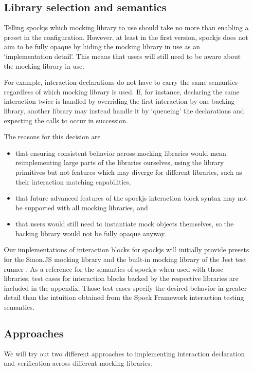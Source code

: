 \subsection{Library selection and semantics}
Telling spockjs which mocking library to use should
take no more than enabling a preset in the configuration.
However, at least in the first version,
spockjs does not aim to be fully opaque
by hiding the mocking library in use as an `implementation detail'.
This means that users will still need to be aware
about the mocking library in use.

For example, interaction declarations
do not have to carry the same semantics
regardless of which mocking library is used.
If, for instance, declaring the same interaction twice
is handled by overriding the first interaction by one backing library,
another library may instead handle it by `queueing' the declarations
and expecting the calls to occur in succession.

The reasons for this decision are
\begin{itemize}
  \item that ensuring consistent behavior across mocking libraries would mean
    reimplementing large parts of the libraries ourselves,
    using the library primitives but not features
    which may diverge for different libraries,
    such as their interaction matching capabilities,
  \item that future advanced features of the spockjs interaction block syntax
    may not be supported with all mocking libraries, and
  \item that users would still need to instantiate mock objects themselves,
    so the backing library would not be fully opaque anyway.
\end{itemize}

Our implementations of interaction blocks for spockjs will initially
provide presets for the Sinon.JS mocking library \autocite{SinonGithub}
and the built-in mocking library of the Jest test runner \autocite{JestGithub}.
As a reference for the semantics of spockjs when used with those libraries,
test cases for interaction blocks backed by the respective libraries
are included in the appendix.
Those test cases specify the desired behavior in greater detail
than the intuition obtained from the
Spock Framework interaction testing semantics.

\subsection{Approaches}
We will try out two different approaches to
implementing interaction declaration and verification
across different mocking libraries.

